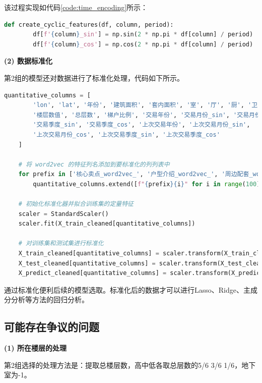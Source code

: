 \documentclass[
    report,     %
    oneside,    %
    UTF8,       %
    zihao=-4    %
]{config} %
\begin{document}
该过程实现如代码\ref{code:time_encoding}所示：

\begin{lstlisting}[label=code:time_encoding, language=Python, caption=交易时间的处理代码]
    def create_cyclic_features(df, column, period):
        df[f'{column}_sin'] = np.sin(2 * np.pi * df[column] / period)
        df[f'{column}_cos'] = np.cos(2 * np.pi * df[column] / period)
\end{lstlisting}

\textbf{(2) 数据标准化}

第2组的模型还对数据进行了标准化处理，代码如下所示。
\begin{lstlisting}[label=code:standardization, language=Python, caption=数据标准化代码]
    quantitative_columns = [
        'lon', 'lat', '年份', '建筑面积', '套内面积', '室', '厅', '厨', '卫',
        '楼层数值', '总层数', '梯户比例', '交易年份', '交易月份_sin', '交易月份_cos',
        '交易季度_sin', '交易季度_cos', '上次交易年份', '上次交易月份_sin',
        '上次交易月份_cos', '上次交易季度_sin', '上次交易季度_cos'
    ]
    
    # 将 word2vec 的特征列名添加到要标准化的列列表中
    for prefix in ['核心卖点_word2vec_', '户型介绍_word2vec_', '周边配套_word2vec_', '交通出行_word2vec_']:
        quantitative_columns.extend([f"{prefix}{i}" for i in range(100)])  # 假设每个 word2vec 列包含100个向量值
    
    # 初始化标准化器并拟合训练集的定量特征
    scaler = StandardScaler()
    scaler.fit(X_train_cleaned[quantitative_columns])
    
    # 对训练集和测试集进行标准化
    X_train_cleaned[quantitative_columns] = scaler.transform(X_train_cleaned[quantitative_columns])
    X_test_cleaned[quantitative_columns] = scaler.transform(X_test_cleaned[quantitative_columns])
    X_predict_cleaned[quantitative_columns] = scaler.transform(X_predict_cleaned[quantitative_columns])
\end{lstlisting}

通过标准化便利后续的模型选取。标准化后的数据才可以进行Lasso、Ridge、主成分分析等方法的回归分析。

\subsection{可能存在争议的问题}

\textbf{(1) 所在楼层的处理}

第2组选择的处理方法是：提取总楼层数，高中低各取总层数的5/6 3/6 1/6，地下室为-1。
\end{document}
